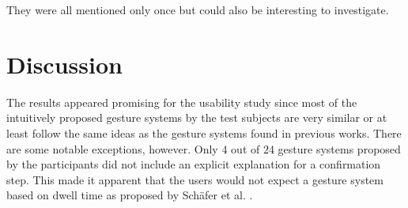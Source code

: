 They were all mentioned only once but could also be interesting to investigate.

\section{Discussion}
The results appeared promising for the usability study since most of the intuitively proposed gesture systems by the test subjects are very similar or at least follow the same ideas as the gesture systems found in previous works. There are some notable exceptions, however. Only $4$ out of $24$ gesture systems proposed by the participants did not include an explicit explanation for a confirmation step. This made it apparent that the users would not expect a gesture system based on dwell time as proposed by Schäfer et al. \cite{Schafer2021}.